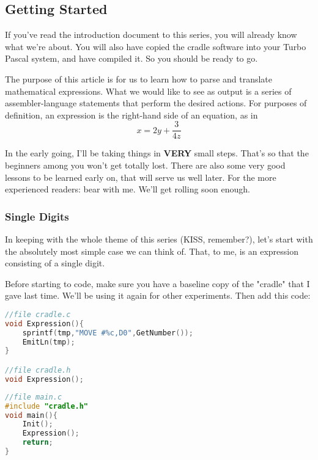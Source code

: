 \subsection{Getting Started}
If you've read the introduction document to this series, you will
already know what  we're  about.    You will also have copied the
cradle software  into your Turbo Pascal system, and have compiled
it.  So you should be ready to go.


The purpose of this article is for us to learn  how  to parse and
translate mathematical expressions.  What we would like to see as
output is a series of assembler-language statements  that perform
the desired actions.    For purposes of definition, an expression
is the right-hand side of an equation, as in
\[
	x = 2y + \frac{3}{4z}
\]

In the early going, I'll be taking things in \textbf{VERY}  small steps.
That's  so  that  the beginners among you won't get totally lost.
There are also  some  very  good  lessons to be learned early on,
that will serve us well later.  For the more experienced readers:
bear with me.  We'll get rolling soon enough.

\subsubsection{Single Digits}
In keeping with the whole theme of this series (KISS, remember?),
let's start with the absolutely most simple case we can think of.
That, to me, is an expression consisting of a single digit.

Before starting to code, make sure you have a  baseline  copy  of
the  "cradle" that I gave last time.  We'll be using it again for
other experiments.  Then add this code:

\begin{lstlisting}[language=C]
//file cradle.c
void Expression(){
	sprintf(tmp,"MOVE #%c,D0",GetNumber()); 
	EmitLn(tmp); 
}

//file cradle.h
void Expression();
\end{lstlisting}


\begin{lstlisting}[language=C]
//file main.c
#include "cradle.h"
void main(){
	Init();
	Expression();
	return;
}

\end{lstlisting}

